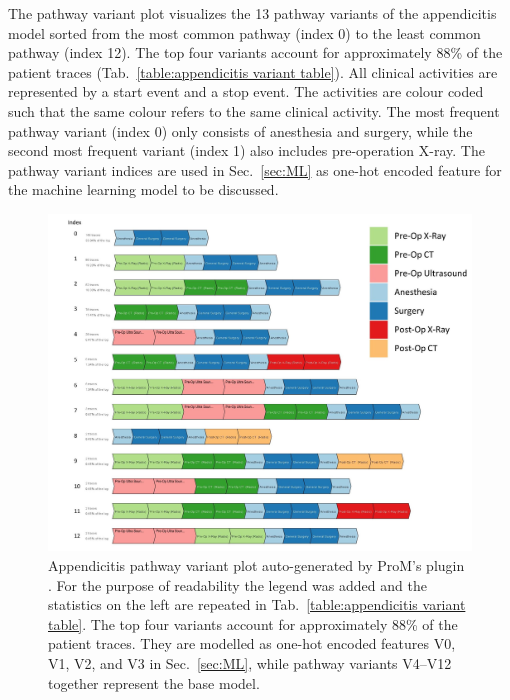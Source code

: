 The pathway variant plot visualizes the 13 pathway variants of the
appendicitis model sorted from the most common pathway (index 0) to
the least common pathway (index 12).
The top four variants account for approximately 88\% of the patient
traces (Tab.~\ref{table:appendicitis variant table}).
All clinical activities are represented by a start event and a stop
event.
The activities are colour coded such that the same colour refers to the same clinical activity. The most frequent pathway variant (index 0) only consists of anesthesia and surgery, while the second most frequent variant (index 1) also includes pre-operation X-ray.
The pathway variant indices are used in Sec.~\ref{sec:ML} as one-hot encoded feature for the machine learning model to be discussed.

\begin{figure}[t]
\hspace{-2cm}
\includegraphics[width=1.5\textwidth]{images/appendicitis_variant_index_anes.jpg}
\caption{Appendicitis pathway variant plot auto-generated by ProM's
  plugin . 
  For the purpose of readability the legend was added and the
  statistics on the left are repeated in Tab.~\ref{table:appendicitis variant table}.
 The top four variants account for approximately 88\% of the patient
 traces. They are modelled as one-hot encoded features V0, V1, V2, and V3
 in Sec.~\ref{sec:ML}, while pathway variants V4--V12 together represent
 the base model.
 }
\label{fig:appendicitis pathway variants}
\end{figure}
\clearpage

